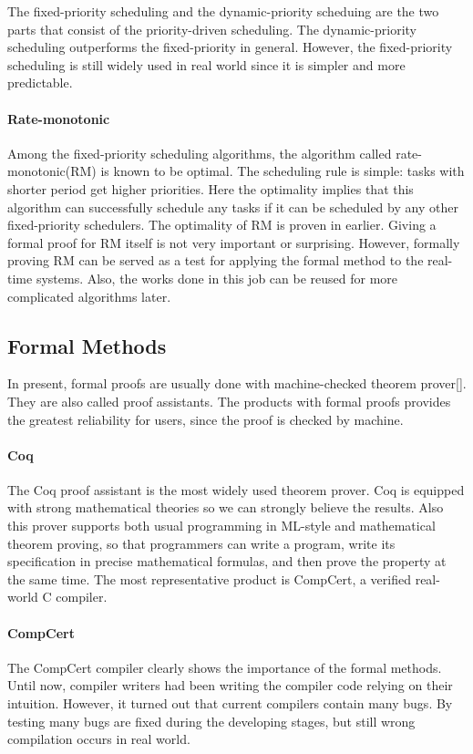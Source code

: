 \documentclass[nocopyrightspace]{sigplanconf}
\begin{document}
The fixed-priority scheduling and the dynamic-priority scheduing are the two parts that consist of the priority-driven scheduling. The dynamic-priority scheduling outperforms the fixed-priority in general. However, the fixed-priority scheduling is still widely used in real world since it is simpler and more predictable.

\paragraph{Rate-monotonic} Among the fixed-priority scheduling algorithms, the algorithm called rate-monotonic(RM) is known to be optimal. The scheduling rule is simple: tasks with shorter period get higher priorities. Here the optimality implies that this algorithm can successfully schedule any tasks if it can be scheduled by any other fixed-priority schedulers. The optimality of RM is proven in earlier\cite{liu1973scheduling}. Giving a formal proof for RM itself is not very important or surprising. However, formally proving RM can be served as a test for applying the formal method to the real-time systems. Also, the works done in this job can be reused for more complicated algorithms later.

\subsection{Formal Methods}

In present, formal proofs are usually done with machine-checked theorem prover[]. They are also called proof assistants. The products with formal proofs provides the greatest reliability for users, since the proof is checked by machine.

\paragraph{Coq}
The Coq proof assistant\cite{coq} is the most widely used theorem prover. Coq is equipped with strong mathematical theories so we can strongly believe the results. Also this prover supports both usual programming in ML-style and mathematical theorem proving, so that programmers can write a program, write its specification in precise mathematical formulas, and then prove the property at the same time. The most representative product is CompCert\cite{leroy2009formal}, a verified real-world C compiler.

\paragraph{CompCert}
The CompCert compiler clearly shows the importance of the formal methods. Until now, compiler writers had been writing the compiler code relying on their intuition. However, it turned out that current compilers contain many bugs\cite{yang2011finding}. By testing many bugs are fixed during the developing stages, but still wrong compilation occurs in real world.
\end{document}
